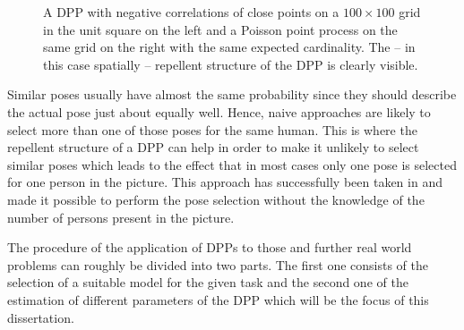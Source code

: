 \begin{enumerate}
\begin{figure}[h!]
	\caption{A DPP with negative correlations of close points on a \(100\times100\) grid in the unit square on the left and a Poisson point process on the same grid on the right with the same expected cardinality. The -- in this case spatially -- repellent structure of the DPP is clearly visible.}
	\label{fig:1}
\end{figure}
Similar poses usually have almost the same probability since they should describe the actual pose just about equally well. Hence, naive approaches are likely to select more than one of those poses for the same human. This is where the repellent structure of a DPP can help in order to make it unlikely to select similar poses which leads to the effect that in most cases only one pose is selected for one person in the picture. This approach has successfully been taken in \cite{kulesza2010structured} and made it possible to perform the pose selection without the knowledge of the number of persons present in the picture.
\end{enumerate}

The procedure of the application of DPPs to those and further real world problems can roughly be divided into two parts. The first one consists of the selection of a suitable model for the given task and the second one of the estimation of 
different parameters of the DPP which will be the focus of this dissertation. %

